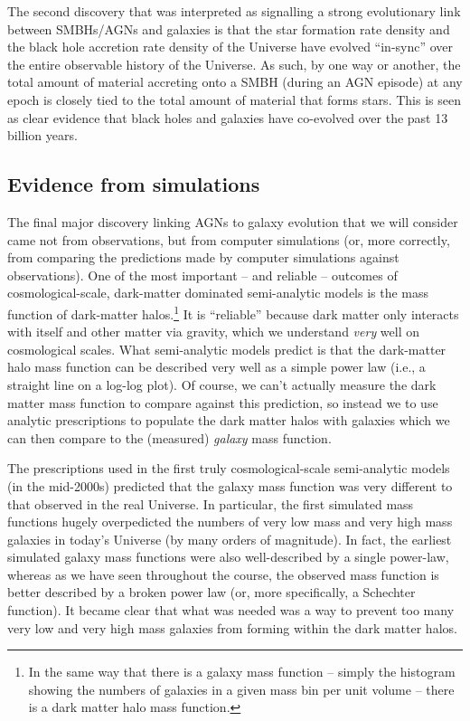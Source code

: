 \documentclass[11pt]{article}
\begin{document}
The second discovery that was interpreted as signalling a strong
evolutionary link between SMBHs/AGNs and galaxies is that the star
formation rate density and the black hole accretion rate density of
the Universe have evolved ``in-sync'' over the entire observable
history of the Universe. As such, by one way or another, the total
amount of material accreting onto a SMBH (during an AGN episode) at
any epoch is closely tied to the total amount of material that forms
stars. This is seen as clear evidence that black holes and galaxies
have co-evolved over the past 13 billion years.

\subsection{Evidence from simulations}
The final major discovery linking AGNs to galaxy evolution that we
will consider came not from observations, but from computer
simulations (or, more correctly, from comparing the predictions made
by computer simulations against observations). One of the most
important -- and reliable -- outcomes of cosmological-scale,
dark-matter dominated semi-analytic models is the mass function of
dark-matter halos.\footnote{In the same way that there is a galaxy
  mass function -- simply the histogram showing the numbers of
  galaxies in a given mass bin per unit volume -- there is a dark
  matter halo mass function.} It is ``reliable'' because dark matter
only interacts with itself and other matter via gravity, which we
understand {\it very} well on cosmological scales. What semi-analytic
models predict is that the dark-matter halo mass function can be
described very well as a simple power law (i.e., a straight line on a
log-log plot). Of course, we can't actually measure the dark matter
mass function to compare against this prediction, so instead we to use
analytic prescriptions to populate the dark matter halos with galaxies
which we can then compare to the (measured) {\it galaxy} mass
function.

The prescriptions used in the first truly cosmological-scale
semi-analytic models (in the mid-2000s) predicted that the galaxy mass
function was very different to that observed in the real Universe. In
particular, the first simulated mass functions hugely overpedicted the
numbers of very low mass and very high mass galaxies in today's
Universe (by many orders of magnitude). In fact, the earliest
simulated galaxy mass functions were also well-described by a single
power-law, whereas as we have seen throughout the course, the observed
mass function is better described by a broken power law (or, more
specifically, a Schechter function). It became clear that what was
needed was a way to prevent too many very low and very high mass
galaxies from forming within the dark matter halos.
\end{document}
